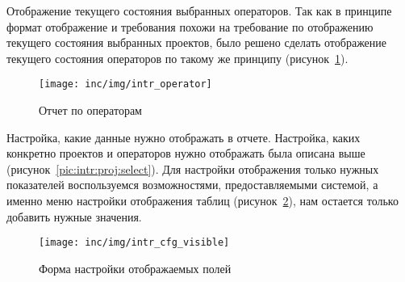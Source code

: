 Отображение текущего состояния выбранных операторов.
Так как в принципе формат отображение и требования похожи
на требование по отображению текущего состояния выбранных проектов,
было решено сделать отображение текущего состояния операторов по такому
же принципу (рисунок~\ref{pic:intr:operator}).

\begin{figure}[ht]
    \centering
    \texttt{[image: inc/img/intr\_operator]}
    \caption{Отчет по операторам}
    \label{pic:intr:operator}
\end{figure}

Настройка, какие данные нужно отображать в отчете.
Настройка, каких конкретно проектов и операторов нужно отображать
была описана выше (рисунок~\ref{pic:intr:proj:select}).
Для настройки отображения только нужных показателей воспользуемся возможностями,
предоставляемыми системой,
а именно меню настройки отображения таблиц (рисунок~\ref{pic:intr:cfg:visible}),
нам остается только добавить нужные значения.

\begin{figure}[ht]
    \centering
    \texttt{[image: inc/img/intr\_cfg\_visible]}
    \caption{Форма настройки отображаемых полей}
    \label{pic:intr:cfg:visible}
\end{figure}